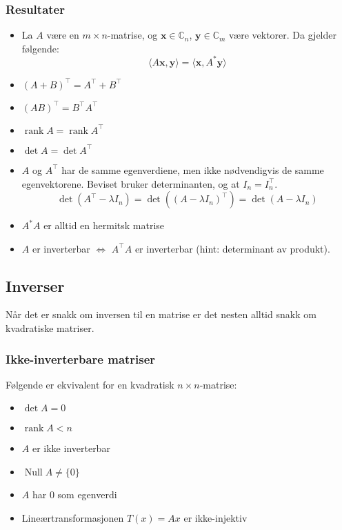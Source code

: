 \documentclass[12pt,a4paper,norsk]{article}
\newcommand{\C}{\mathbb{C}}
\newcommand{\inner}[1]{\langle#1\rangle}
\DeclareMathOperator{\Null}{Null}
\DeclareMathOperator{\rank}{rank}
\newcommand{\vx}{\textbf{x}}
\newcommand{\vy}{\textbf{y}}
\begin{document}
\subsubsection{Resultater}
\begin{itemize}
  \item La $A$ være en $m \times n$-matrise, og $\vx \in \C_{n}$, $\vy \in \C_{m}$ være vektorer.
    Da gjelder følgende:
    \[\inner{A\vx,\vy} = \inner{\vx,A^{*}\vy}\]
  \item ${(A+B)}^{\top} = A^{\top} + B^{\top}$
  \item ${(AB)}^{\top} = B^{\top}A^{\top}$
  \item $\rank A = \rank A^{\top}$
  \item $\det A = \det A^{\top}$
  \item $A$ og $A^{\top}$ har de samme egenverdiene, men ikke
    nødvendigvis de samme egenvektorene. Beviset bruker determinanten, og at
    $I_{n} = I_{n}^{\top}$.
    \[\det(A^{\top}-\lambda I_{n}) = \det({(A-\lambda I_{n})}^{\top}) = \det(A-\lambda I_{n})\]
  \item $A^{*}A$ er alltid en hermitsk matrise
  \item $A$ er inverterbar $\iff$ $A^{\top}A$ er inverterbar (hint: determinant av produkt).
\end{itemize}

\subsection{Inverser}
Når det er snakk om inversen til en matrise er det nesten alltid snakk om
kvadratiske matriser.

\subsubsection{Ikke-inverterbare matriser}\label{sec:ikke-inverterbare_matriser}
Følgende er ekvivalent for en kvadratisk $n \times n$-matrise:
\begin{itemize}
  \item $\det A = 0$
  \item $\rank A < n$
  \item $A$ er ikke inverterbar
  \item $\Null A \neq \{0\}$
  \item $A$ har $0$ som egenverdi
  \item Lineærtransformasjonen $T(x) = Ax$ er ikke-injektiv
\end{itemize}
\end{document}
